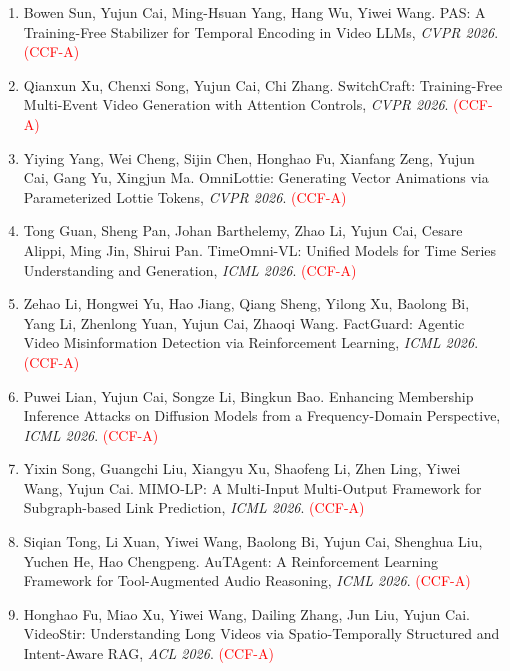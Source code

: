 \begin{enumerate}
\item Bowen Sun, Yujun Cai, Ming-Hsuan Yang, Hang Wu, Yiwei Wang. PAS: A Training-Free Stabilizer for Temporal Encoding in Video LLMs, \textit{CVPR 2026}. \textcolor{red}{(CCF-A)}

\item Qianxun Xu, Chenxi Song, Yujun Cai, Chi Zhang. SwitchCraft: Training-Free Multi-Event Video Generation with Attention Controls, \textit{CVPR 2026}. \textcolor{red}{(CCF-A)}

\item Yiying Yang, Wei Cheng, Sijin Chen, Honghao Fu, Xianfang Zeng, Yujun Cai, Gang Yu, Xingjun Ma. OmniLottie: Generating Vector Animations via Parameterized Lottie Tokens, \textit{CVPR 2026}. \textcolor{red}{(CCF-A)}

\item Tong Guan, Sheng Pan, Johan Barthelemy, Zhao Li, Yujun Cai, Cesare Alippi, Ming Jin, Shirui Pan. TimeOmni-VL: Unified Models for Time Series Understanding and Generation, \textit{ICML 2026}. \textcolor{red}{(CCF-A)}

\item Zehao Li, Hongwei Yu, Hao Jiang, Qiang Sheng, Yilong Xu, Baolong Bi, Yang Li, Zhenlong Yuan, Yujun Cai, Zhaoqi Wang. FactGuard: Agentic Video Misinformation Detection via Reinforcement Learning, \textit{ICML 2026}. \textcolor{red}{(CCF-A)}

\item Puwei Lian, Yujun Cai, Songze Li, Bingkun Bao. Enhancing Membership Inference Attacks on Diffusion Models from a Frequency-Domain Perspective, \textit{ICML 2026}. \textcolor{red}{(CCF-A)}

\item Yixin Song, Guangchi Liu, Xiangyu Xu, Shaofeng Li, Zhen Ling, Yiwei Wang, Yujun Cai. MIMO-LP: A Multi-Input Multi-Output Framework for Subgraph-based Link Prediction, \textit{ICML 2026}. \textcolor{red}{(CCF-A)}

\item Siqian Tong, Li Xuan, Yiwei Wang, Baolong Bi, Yujun Cai, Shenghua Liu, Yuchen He, Hao Chengpeng. AuTAgent: A Reinforcement Learning Framework for Tool-Augmented Audio Reasoning, \textit{ICML 2026}. \textcolor{red}{(CCF-A)}

\item Honghao Fu, Miao Xu, Yiwei Wang, Dailing Zhang, Jun Liu, Yujun Cai. VideoStir: Understanding Long Videos via Spatio-Temporally Structured and Intent-Aware RAG, \textit{ACL 2026}. \textcolor{red}{(CCF-A)}


\end{enumerate}
